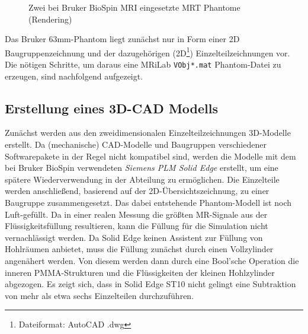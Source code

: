 \begin{figure}[H]
	\centering
	\hfill
	\caption{Zwei bei Bruker BioSpin MRI eingesetzte MRT Phantome (Rendering)}
\end{figure}

Das Bruker 63mm-Phantom liegt zunächst nur in Form einer 2D Baugruppenzeichnung und der dazugehörigen (2D\footnote{Dateiformat: AutoCAD .dwg}) Einzelteilzeichnungen vor. Die nötigen Schritte, um daraus eine MRiLab \texttt{VObj*.mat} Phantom-Datei zu erzeugen, sind nachfolgend aufgezeigt.

\subsection{Erstellung eines 3D-CAD Modells}
Zunächst werden aus den zweidimensionalen Einzelteilzeichnungen 3D-Modelle erstellt. Da (mechanische) CAD-Modelle und Baugruppen verschiedener Softwarepakete in der Regel nicht kompatibel sind, werden die Modelle mit dem bei Bruker BioSpin verwendeten \textit{Siemens PLM Solid Edge} erstellt, um eine spätere Wiederverwendung in der Abteilung zu ermöglichen. Die Einzelteile werden anschließend, basierend auf der 2D-Übersichtszeichnung, zu einer Baugruppe zusammengesetzt. Das dabei entstehende Phantom-Modell ist noch Luft-gefüllt. Da in einer realen Messung die größten MR-Signale aus der Flüssigkeitsfüllung resultieren, kann die Füllung für die Simulation nicht vernachlässigt werden. Da Solid Edge keinen Assistent zur Füllung von Hohlräumen anbietet, muss die Füllung zunächst durch einen Vollzylinder angenähert werden. Von diesem werden dann durch eine Bool'sche Operation die inneren PMMA-Strukturen und die Flüssigkeiten der kleinen Hohlzylinder abgezogen. Es zeigt sich, dass in Solid Edge ST10 nicht gelingt eine Subtraktion von mehr als etwa sechs Einzelteilen durchzuführen.

